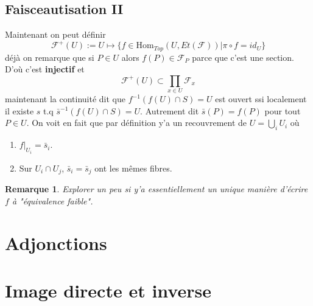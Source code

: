 \documentclass[a4paper,12pt]{book}
\newcommand{\F}{\mathscr F}
\newcommand{\Hom}{\textrm{Hom}}
\theoremstyle{plain}
\newtheorem{rem}{Remarque}
\theoremstyle{definition}
\theoremstyle{remark}
\begin{document}
\subsection{Faisceautisation II}
Maintenant on peut définir 
\[\F^+(U):= U\mapsto \{f\in\Hom_{Top}(U,Et(\F))| \pi\circ f = id_U\}\]
déjà on remarque que si $P\in U$ alors $f(P)\in \F_P$ parce que c'est
une section. D'où c'est \textbf{injectif} et
\[\F^+(U)\subset \prod_{x\in U} \F_x\]
maintenant la continuité dit que $f^{-1}(f(U)\cap S)=U$ est ouvert 
ssi localement il existe $s$ t.q $\bar s^{-1}(f(U)\cap S)= U$. Autrement
dit $\bar s(P)=f(P)$ pour tout $P\in U$. On voit en fait que par 
définition y'a un recouvrement de $U=\bigcup_i U_i$ où
\begin{enumerate}
  \item $f|_{U_i}=\bar s_i$.
  \item Sur $U_i\cap U_j$, $\bar s_i=\bar s_j$ ont les mêmes fibres.
\end{enumerate}
\begin{rem}
  Explorer un peu si y'a essentiellement un unique manière d'écrire
  $f$ à "équivalence faible".
\end{rem}
\section{Adjonctions}
\section{Image directe et inverse}



\end{document}
